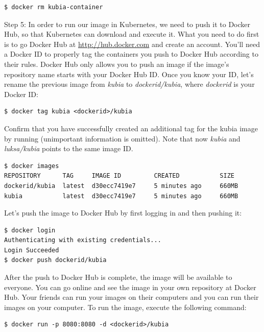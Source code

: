 \documentclass[a4paper,10pt]{article}
\begin{document}
\begin{lstlisting}[numbers=none, basicstyle=\mdseries]
$ docker rm kubia-container
\end{lstlisting}

Step 5: In order to run our image in Kubernetes, we need to push it to Docker Hub, so that Kubernetes can download and execute it. What you need to do first is to go Docker Hub at \url{http://hub.docker.com} and create an account. You'll need a Docker ID to properly tag the containers you push to Docker Hub according to their rules. Docker Hub only allows you to push an image if the image's repository name starts with your Docker Hub ID. Once you know your ID, let's rename the previous image from \textit{kubia} to \textit{dockerid/kubia}, where \textit{dockerid} is your Docker ID:

\begin{lstlisting}[numbers=none, basicstyle=\mdseries]
$ docker tag kubia <dockerid>/kubia
\end{lstlisting}

Confirm that you have successfully created an additional tag for the kubia image by running (unimportant information is omitted). Note that now \textit{kubia} and \textit{luksa/kubia} points to the same image ID.

\begin{lstlisting}[numbers=none, basicstyle=\mdseries]
$ docker images
REPOSITORY    	TAG     IMAGE ID         CREATED           SIZE
dockerid/kubia  latest  d30ecc7419e7     5 minutes ago	   660MB
kubia           latest  d30ecc7419e7     5 minutes ago	   660MB
\end{lstlisting}

Let's push the image to Docker Hub by first logging in and then pushing it:

\begin{lstlisting}[numbers=none, basicstyle=\mdseries]
$ docker login
Authenticating with existing credentials...
Login Succeeded
$ docker push dockerid/kubia
\end{lstlisting}

After the push to Docker Hub is complete, the image will be available to everyone. You can go online and see the image in your own repository at Docker Hub. Your friends can run your images on their computers and you can run their images on your computer. To run the image, execute the following command:

\begin{lstlisting}[numbers=none, basicstyle=\mdseries]
$ docker run -p 8080:8080 -d <dockerid>/kubia
\end{lstlisting}
\end{document}

